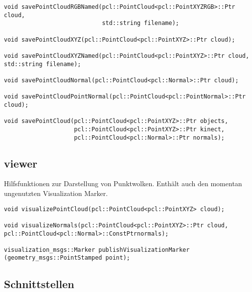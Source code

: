 \documentclass{suturo}
\begin{document}
\begin{verbatim}
void savePointCloudRGBNamed(pcl::PointCloud<pcl::PointXYZRGB>::Ptr cloud,
                            std::string filename);
                            
void savePointCloudXYZ(pcl::PointCloud<pcl::PointXYZ>::Ptr cloud);

void savePointCloudXYZNamed(pcl::PointCloud<pcl::PointXYZ>::Ptr cloud,
std::string filename);

void savePointCloudNormal(pcl::PointCloud<pcl::Normal>::Ptr cloud);

void savePointCloudPointNormal(pcl::PointCloud<pcl::PointNormal>::Ptr cloud);

void savePointCloud(pcl::PointCloud<pcl::PointXYZ>::Ptr objects,
                    pcl::PointCloud<pcl::PointXYZ>::Ptr kinect,
                    pcl::PointCloud<pcl::Normal>::Ptr normals);
\end{verbatim}

\subsection*{viewer}
Hilfsfunktionen zur Darstellung von Punktwolken.
Enthält auch den momentan ungenutzten Visualization Marker.

\begin{verbatim}
void visualizePointCloud(pcl::PointCloud<pcl::PointXYZ> cloud);

void visualizeNormals(pcl::PointCloud<pcl::PointXYZ>::Ptr cloud,
pcl::PointCloud<pcl::Normal>::ConstPtrnormals);

visualization_msgs::Marker publishVisualizationMarker
(geometry_msgs::PointStamped point);
\end{verbatim}


\subsection{Schnittstellen}
\end{document}
